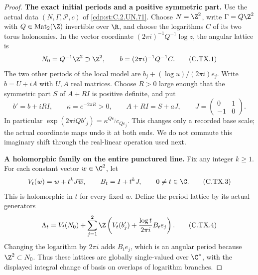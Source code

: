 \begin{proof}
\par\medskip\noindent\textbf{The exact initial periods and a positive symmetric part.}
Use the actual data $(N,\Gamma,\mathscr P,c)$ of \ref{cdp:st:C.2.UN.71}.
Choose $N=\Z^2$, write $\Gamma=Q\Z^2$ with
$Q\in\operatorname{Mat}_2(\Z)$ invertible over $\R$,
and choose the logarithms $C$ of its two torus
holonomies. In the vector coordinate
$(2\pi i)^{-1}Q^{-1}\log z$, the angular lattice is
\[
        N_0=Q^{-1}\Z^2\supset\Z^2,
             \qquad b=(2\pi i)^{-1}Q^{-1}C.
\tag{C.TX.1}\label{cdp:eq:C.TX.1}
\]
The two other periods of the local model are
$b_j+(\log u)/(2\pi i)e_j$. Write $b=U+iA$
with $U,A$ real matrices. Choose $R>0$ large enough
that the symmetric part $S$ of $A+RI$ is positive
definite, and put
\[
 b'=b+iRI,
 \qquad \kappa=e^{-2\pi R}>0,
 \qquad A+RI=S+aJ,
 \qquad J=\begin{pmatrix}0&1\\-1&0\end{pmatrix}.
\tag{C.TX.2}\label{cdp:eq:C.TX.2}
\]
In particular
$\exp(2\pi iQb'_j)=\kappa^{Qe_j}c_{Qe_j}$.
This changes only a recorded base scale; the
actual coordinate maps undo it at both ends.
We do not commute this imaginary shift through
the real-linear operation used next.

\par\medskip\noindent\textbf{A holomorphic family on the entire punctured line.}
Fix any integer $k\ge1$. For each constant
vector $w\in\C^2$, let
\[
 V_t(w)=w+t^kJ\overline w,
 \qquad B_t=I+t^kJ,
 \qquad 0\ne t\in\C.
\tag{C.TX.3}\label{cdp:eq:C.TX.3}
\]
This is holomorphic in $t$ for every fixed $w$.
Define the period lattice by its actual generators
\[
 \Lambda_t=V_t(N_0)
   +\sum_{j=1}^2\Z
       \left(V_t(b'_j)+\frac{\log t}{2\pi i}B_te_j\right).
\tag{C.TX.4}\label{cdp:eq:C.TX.4}
\]
Changing the logarithm by $2\pi i$ adds $B_te_j$,
which is an angular period because $\Z^2\subset N_0$.
Thus these lattices are globally single-valued
over $\C^*$, with the displayed integral change
of basis on overlaps of logarithm branches.


\end{proof}
